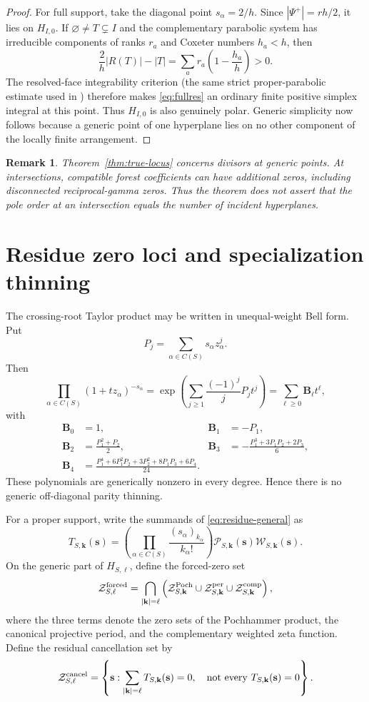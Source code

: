 \documentclass[11pt]{article}
\newtheorem{remark}[theorem]{Remark}
\newcommand{\cP}{\mathcal P}
\newcommand{\cW}{\mathcal W}
\newcommand{\Zero}{\mathcal Z}
\begin{document}
\begin{proof}
For full support, take the diagonal point $s_\alpha=2/h$.  Since
$|\Psi^+|=rh/2$, it lies on $H_{I,0}$.  If
$\varnothing\ne T\subsetneq I$ and the complementary parabolic system
has irreducible components of ranks $r_a$ and Coxeter numbers $h_a<h$,
then
\[
 \frac{2}{h}|R(T)|-|T|
 =\sum_a r_a\left(1-\frac{h_a}{h}\right)>0.
\]
The resolved-face integrability criterion (the same strict
proper-parabolic estimate used in \cite{MatuzasLeading2026}) therefore
makes \eqref{eq:fullres} an ordinary finite positive simplex integral at this
point.  Thus $H_{I,0}$ is also genuinely polar.  Generic simplicity now
follows because a generic point of one hyperplane lies on no other
component of the locally finite arrangement.
\end{proof}

\begin{remark}
Theorem~\ref{thm:true-locus} concerns divisors at generic points.  At
intersections, compatible forest coefficients can have additional
zeros, including disconnected reciprocal-gamma zeros.  Thus the theorem
does not assert that the pole order at an intersection equals the number
of incident hyperplanes.
\end{remark}

\section{Residue zero loci and specialization thinning}

The crossing-root Taylor product may be written in unequal-weight Bell
form.  Put
\[
 P_j=\sum_{\alpha\in C(S)}s_\alpha z_\alpha^j.
\]
Then
\[
 \prod_{\alpha\in C(S)}(1+t z_\alpha)^{-s_\alpha}
 =\exp\left(\sum_{j\ge1}\frac{(-1)^j}{j}P_jt^j\right)
 =\sum_{\ell\ge0}\mathbf B_\ell t^\ell,
\]
with
\begin{align*}
 \mathbf B_0&=1,&
 \mathbf B_1&=-P_1,\\
 \mathbf B_2&=\frac{P_1^2+P_2}{2},&
 \mathbf B_3&=-\frac{P_1^3+3P_1P_2+2P_3}{6},\\
 \mathbf B_4&=
 \frac{P_1^4+6P_1^2P_2+3P_2^2+8P_1P_3+6P_4}{24}.
\end{align*}
These polynomials are generically nonzero in every degree.  Hence there
is no generic off-diagonal parity thinning.

For a proper support, write the summands of
\eqref{eq:residue-general} as
\[
 T_{S,\mathbf k}(\mathbf s)=
 \left(\prod_{\alpha\in C(S)}
       \frac{(s_\alpha)_{k_\alpha}}{k_\alpha!}\right)
 \cP_{S,\mathbf k}(\mathbf s)\cW_{S,\mathbf k}(\mathbf s).
\]
On the generic part of \(H_{S,\ell}\), define the forced-zero set
\[
 \Zero^{\rm forced}_{S,\ell}
 =
 \bigcap_{|\mathbf k|=\ell}
 \left(
   \Zero^{\rm Poch}_{S,\mathbf k}
   \cup\Zero^{\rm per}_{S,\mathbf k}
   \cup\Zero^{\rm comp}_{S,\mathbf k}
 \right),
\]
where the three terms denote the zero sets of the Pochhammer product,
the canonical projective period, and the complementary weighted zeta
function.  Define the residual cancellation set by
\[
 \Zero^{\rm cancel}_{S,\ell}
 =
 \left\{\mathbf s:
 \sum_{|\mathbf k|=\ell}T_{S,\mathbf k}(\mathbf s)=0,\quad
 \text{not every }T_{S,\mathbf k}(\mathbf s)=0\right\}.
\]
\end{document}
